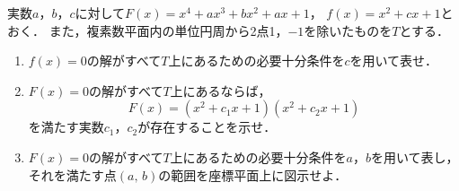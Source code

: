 \documentclass[../../main.tex]{subfiles}
\begin{document}
実数$a$，$b$，$c$に対して$F(x)=x^4+ax^3+bx^2+ax+1$，
$f(x)=x^2+cx+1$とおく．
また，複素数平面内の単位円周から2点1，$-1$を除いたものを$T$とする．
\begin{enumerate}
  \item$f(x)=0$の解がすべて$T$上にあるための必要十分条件を$c$を用いて表せ．
  \item$F(x)=0$の解がすべて$T$上にあるならば，
    \[ F(x)=(x^2+c_1x+1)(x^2+c_2x+1) \]
    を満たす実数$c_1$，$c_2$が存在することを示せ．
  \item$F(x)=0$の解がすべて$T$上にあるための必要十分条件を$a$，$b$を用いて表し，
    それを満たす点$(a, \, b)$の範囲を座標平面上に図示せよ．
\end{enumerate}
\end{document}
